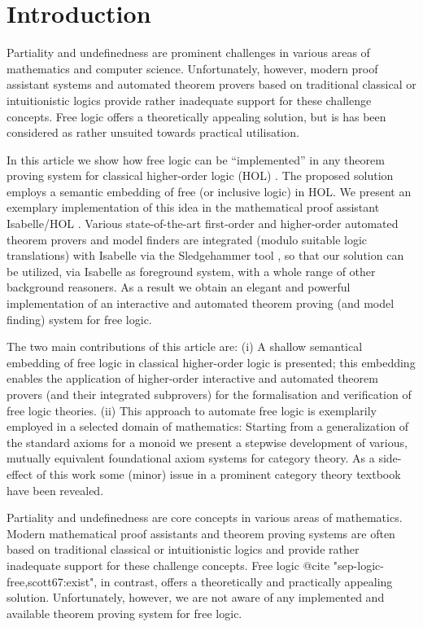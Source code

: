 \section{Introduction}
\label{intro}
Partiality and undefinedness are prominent challenges in various areas
of mathematics and computer science.  Unfortunately, however, modern
proof assistant systems and automated theorem provers based on
traditional classical or intuitionistic logics provide rather
inadequate support for these challenge concepts.  Free logic offers a
theoretically appealing solution, but is has been considered as rather
unsuited towards practical utilisation.


In this article we show how free logic can be
``implemented'' in any theorem proving system for classical
higher-order logic (HOL) \cite{B5}. The proposed solution employs a
semantic embedding of free (or inclusive logic) in HOL. We present an
exemplary implementation of this idea in the mathematical proof
assistant Isabelle/HOL \cite{NPW02}. Various state-of-the-art
first-order and higher-order automated theorem provers and model
finders are integrated (modulo suitable logic translations) with
Isabelle via the Sledgehammer tool \cite{Sledgehammer}, so that our
solution can be utilized, via Isabelle as foreground system, with a
whole range of other background reasoners. As a result we obtain an
elegant and powerful implementation of an interactive and automated
theorem proving (and model finding) system for free logic.


  The two main contributions of this article are: (i) A shallow
  semantical embedding of free logic in classical higher-order logic
  is presented; this embedding enables the application of higher-order
  interactive and automated theorem provers (and their integrated
  subprovers) for the formalisation and verification of free logic
  theories.  (ii) This approach to automate free logic is exemplarily
  employed in a selected domain of mathematics: Starting from a
  generalization of the standard axioms for a monoid we present a
  stepwise development of various, mutually equivalent foundational
  axiom systems for category theory. As a side-effect of this work
  some (minor) issue in a prominent category theory textbook have been
  revealed.



Partiality and undefinedness are core concepts in various areas of
mathematics.  Modern mathematical proof assistants and theorem proving
systems are often based on traditional classical or intuitionistic
logics and provide rather inadequate support for these challenge
concepts.  Free logic @{cite "sep-logic-free,scott67:exist"}, in
contrast, offers a theoretically and practically appealing
solution. Unfortunately, however, we are not aware of any implemented
and available theorem proving system for free logic.
 
